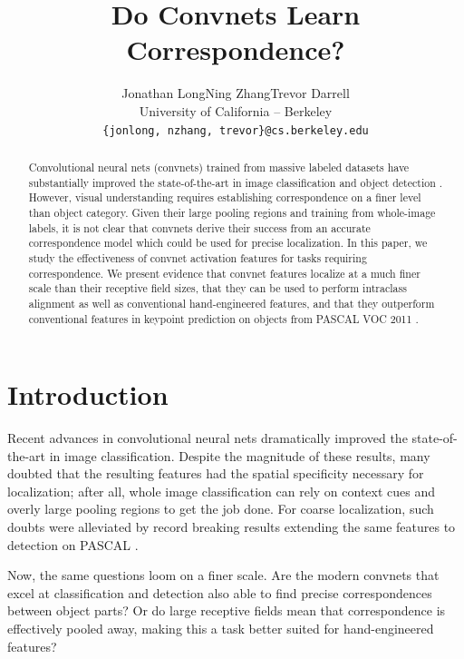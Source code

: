 \documentclass{article} %
\title{Do Convnets Learn Correspondence?}
\author{
Jonathan Long\hspace{3em}Ning Zhang\hspace{3em}Trevor Darrell \\
University of California -- Berkeley \\
\texttt{\{jonlong, nzhang, trevor\}@cs.berkeley.edu} \\
}
\newcommand{\ning}[1]{}
\begin{document}
\maketitle

\begin{abstract}
    Convolutional neural nets (convnets) trained from massive labeled datasets
    \cite{ImageNet} have substantially improved the state-of-the-art in image
    classification \cite{Krizhevsky} and object detection \cite{RossJeff}.
    However, visual understanding requires establishing correspondence on a finer
    level than object category.
    Given their large pooling regions and training from whole-image labels, it
    is not clear that convnets derive their success from an accurate
    correspondence model which could be used for precise localization.
    In this paper, we study the effectiveness of convnet activation features for
    tasks requiring correspondence.
    We present evidence that convnet features localize at a much finer scale
    than their receptive field sizes, that they can be used to perform intraclass
    alignment as well as conventional hand-engineered features, and that they
    outperform conventional features in keypoint prediction on objects from
    PASCAL VOC 2011 \cite{pascal}.

\end{abstract}

\section{Introduction}

Recent advances in convolutional neural nets \cite{Krizhevsky} dramatically
improved the state-of-the-art in image classification.
Despite the magnitude of these results, many doubted
\cite{YannLeCunsGooglePlusPage} that the resulting features had the spatial
specificity necessary for localization; after all, whole image classification
can rely on context cues and overly large pooling regions to get the job done.
For coarse localization, such doubts were alleviated by record breaking results
extending the same features to detection on PASCAL \cite{RossJeff}.

Now, the same questions loom on a finer scale. Are the modern convnets that
excel at classification and detection also able to find precise correspondences
between object parts?
Or do large receptive fields mean that correspondence is effectively pooled
away, making this a task better suited for hand-engineered features?
\end{document}
